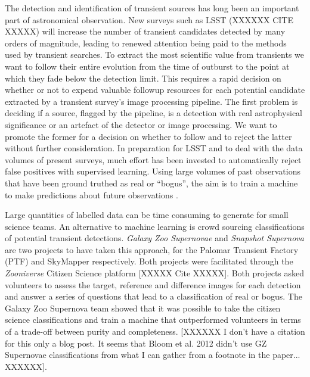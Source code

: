 \documentclass[a4paper,fleqn,usenatbib]{mnras}
\begin{document}
The detection and identification of transient sources has long been an important part of astronomical observation. New surveys such as LSST (XXXXXX CITE XXXXX) will increase the number of transient candidates detected by many orders of magnitude, leading to renewed attention being paid to the methods used by transient searches.  To extract the most scientific value from transients we want to follow their entire evolution from the time of outburst to the point at which they fade below the detection limit.  This requires a rapid decision on whether or not to expend valuable followup resources for each potential candidate extracted by a transient survey's image processing pipeline.  The first problem is deciding if a source, flagged by the pipeline, is a detection with real astrophysical significance or an artefact of the detector or image processing.  We want to promote the former for a decision on whether to follow and to reject the latter without further consideration.  In preparation for LSST and to deal with the data volumes of present surveys, much effort has been invested to automatically reject false positives with supervised learning. Using large volumes of past observations that have been ground truthed as real or ``bogus'', the aim is to train a machine to make predictions about future observations \citep{Bloom12, Brink13, Goldstein15, duBuisson15, Donalek08, Romano06, Bailey07}.


Large quantities of labelled data can be time consuming to generate for small science teams.  An alternative to machine learning is crowd sourcing classifications of potential transient detections.  \textit{Galaxy Zoo Supernovae} \citep{Smith11} and \textit{Snapshot Supernova} \citep{Campbell15} are two projects to have taken this approach, for the Palomar Transient Factory (PTF) \citep{Rau09, Law09} and SkyMapper respectively.  Both projects were facilitated through the \textit{Zooniverse} Citizen Science platform [XXXXX Cite XXXXX].  Both projects asked volunteers to assess the target, reference and difference images for each detection and answer a series of questions that lead to a classification of real or bogus.  The Galaxy Zoo Supernova team showed that it was possible to take the citizen science classifications and train a machine that outperformed volunteers in terms of a trade-off between purity and completeness.   [XXXXXX I don't have a citation for this only a blog post.  It seems that Bloom et al. 2012 didn't use GZ Supernovae classifications from what I can gather from a footnote in the paper... XXXXXX].
\end{document}
